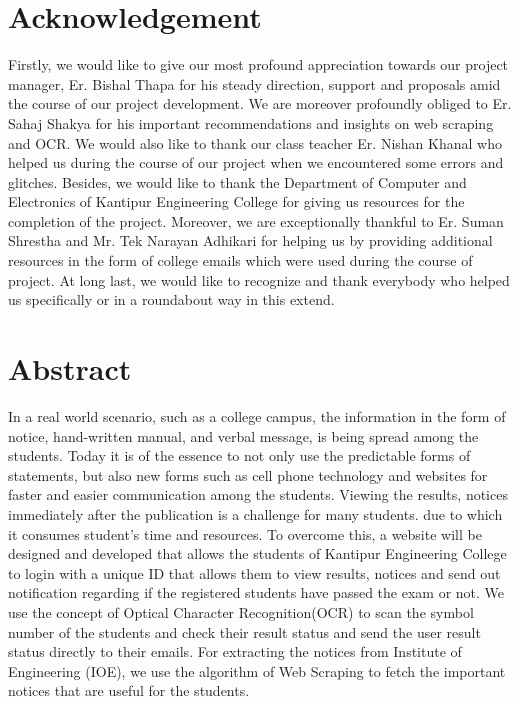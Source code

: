 

\KECcoverpage %
\KECtitlepage %

\chapter*{Acknowledgement}

Firstly, we would like to give our most profound appreciation towards our project manager, Er. Bishal Thapa for his steady direction, support and proposals amid the course of our project development. We are moreover profoundly obliged to Er. Sahaj Shakya for his important recommendations and insights on web scraping and OCR. We would also like to thank our class teacher Er. Nishan Khanal who helped us during the course of our project when we encountered some errors and glitches. Besides, we would like to thank the Department of Computer and Electronics of Kantipur Engineering College for giving us resources for the completion of the project. Moreover, we are exceptionally thankful to Er. Suman Shrestha and Mr. Tek Narayan Adhikari for helping us by providing additional resources in the form of college emails which were used during the course of project. At long last, we would like to recognize and thank everybody who helped us specifically or in a roundabout way in this extend.



 



\chapter*{Abstract} %
In a real world scenario, such as a college campus, the information in the form of notice, 
hand-written manual, and verbal message, is being spread among the students. Today 
it is of the essence to not only use the predictable forms of statements, but also new 
forms such as cell phone technology and websites for faster and easier communication 
among the students. Viewing the results, notices immediately after the publication is a 
challenge for many students. due to which it consumes student’s time and resources. 
To overcome this, a website will be designed and developed that allows the students of 
Kantipur Engineering College to login with a unique ID that allows them to view 
results, notices and send out notification regarding if the registered students have passed 
the exam or not. We use the concept of Optical Character Recognition(OCR) to scan 
the symbol number of the students and check their result status and send the user result 
status directly to their emails. For extracting the notices from Institute of Engineering
(IOE), we use the algorithm of Web Scraping to fetch the important notices that are 
useful for the students.

